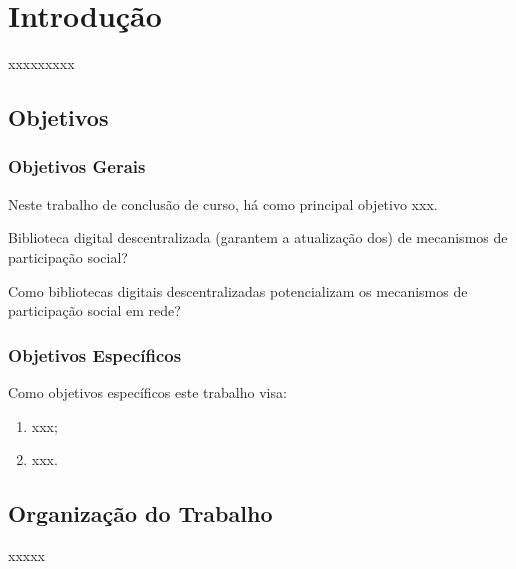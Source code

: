 \chapter{Introdução}

xxxxxxxxx

\section{Objetivos}

\subsection{Objetivos Gerais}

Neste trabalho de conclusão de curso, há como principal objetivo xxx.

Biblioteca digital descentralizada (garantem a atualização dos) de mecanismos de participação social?

Como bibliotecas digitais descentralizadas potencializam os mecanismos de participação social em rede?
\subsection{Objetivos Específicos}

Como objetivos específicos este trabalho visa:

\begin{enumerate}
\item xxx;
\item xxx.
\end{enumerate}

\section{Organização do Trabalho}

xxxxx
